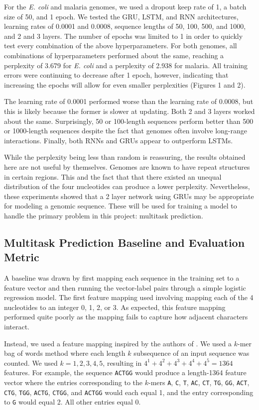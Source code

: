 \documentclass{article} %
\begin{document}
For the \textit{E. coli} and malaria genomes, we used a dropout keep rate of 1, a batch size of 50, and 1 epoch. We tested the GRU, LSTM, and RNN architectures, learning rates of 0.0001 and 0.0008, sequence lengths of 50, 100, 500, and 1000, and 2 and 3 layers. The number of epochs was limited to 1 in order to quickly test every combination of the above hyperparameters. For both genomes, all combinations of hyperparameters performed about the same, reaching a perplexity of 3.679 for \textit{E. coli} and a perplexity of 2.938 for malaria. All training errors were continuing to decrease after 1 epoch, however, indicating that increasing the epochs will allow for even smaller perplexities (Figures 1 and 2).

The learning rate of 0.0001 performed worse than the learning rate of 0.0008, but this is likely because the former is slower at updating. Both 2 and 3 layers worked about the same. Surprisingly, 50 or 100-length sequences perform better than 500 or 1000-length sequences despite the fact that genomes often involve long-range interactions. Finally, both RNNs and GRUs appear to outperform LSTMs.

While the perplexity being less than random is reassuring, the results obtained here are not useful by themselves. Genomes are known to have repeat structures in certain regions. This and the fact that that there existed an unequal distribution of the four nucleotides can produce a lower perplexity. Nevertheless, these experiments showed that a 2 layer network using GRUs may be appropriate for modeling a genomic sequence. These will be used for training a model to handle the primary problem in this project: multitask prediction.

\subsection{Multitask Prediction Baseline and Evaluation Metric}

A baseline was drawn by first mapping each sequence in the training set to a feature vector and then running the vector-label pairs through a simple logistic regression model. The first feature mapping used involving mapping each of the 4 nucleotides to an integer 0, 1, 2, or 3. As expected, this feature mapping performed quite poorly as the mapping fails to capture how adjacent characters interact.

Instead, we used a feature mapping inspired by the authors of \cite{quang2015danq}. We used a $k$-mer bag of words method where each length $k$ subsequence of an input sequence was counted. We used $k = 1, 2, 3, 4, 5$, resulting in $4^1 + 4^2+4^3+4^4+4^5 = 1364$ features. For example, the sequence \texttt{ACTGG} would produce a length-1364 feature vector where the entries corresponding to the $k$-mers \texttt{A}, \texttt{C}, \texttt{T}, \texttt{AC}, \texttt{CT}, \texttt{TG}, \texttt{GG}, \texttt{ACT}, \texttt{CTG}, \texttt{TGG}, \texttt{ACTG}, \texttt{CTGG}, and \texttt{ACTGG} would each equal 1, and the entry corresponding to \texttt{G} would equal 2. All other entries equal 0.
\end{document}
